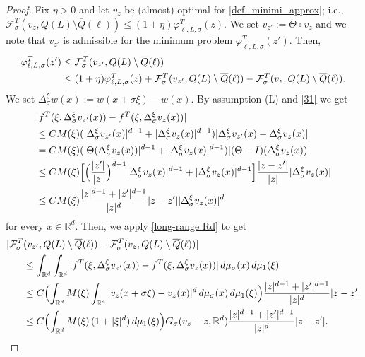 \documentclass{article}
\theoremstyle{plain}
\theoremstyle{definition}
\def\rr{{\mathbb R}}
\def\ms{\mu_\sigma}
\newcommand{\f}{\varphi}
\newcommand{\s}{\sigma}
\numberwithin{equation}{section}
\begin{document}
\begin{proof}
        Fix $\eta>0$ and let $v_{z}$ be (almost) optimal for \eqref{def_minimi_approx}; i.e., $\mathcal{F}^T_{\s}(v_{z},Q(L)\setminus \overline{Q}(\ell)) \leq(1+\eta)\f^T_{\ell,L,\s}(z)$.
 We set $v_{z'}:=\Theta \circ v_z$ and we note that $v_{z'}$ is admissible for the minimum problem $\f^T_{\ell,L,\s}(z')$. 
 Then,
 \begin{align}
\notag \f^T_{\ell,L,\s}(z')&\leq  \mathcal{F}^T_{\s}(v_{z'},Q(L)\setminus \overline{Q}(\ell))\\ \label{stima_funzione_ottimizzante}
     & \leq (1+\eta)\f^T_{\ell,L,\s}(z)+\mathcal{F}^T_{\s}(v_{z'},Q(L)\setminus \overline{Q}(\ell))-\mathcal{F}^T_{\s}(v_{z},Q(L)\setminus \overline{Q}(\ell)).
 \end{align}
 We set $\Delta_\s^\xi w(x):=w(x+\s\xi)-w(x)$. By assumption (L) and \eqref{31} we get
 \begin{align*}
& |f^T(\xi,\Delta_\s^\xi v_{z'}(x))-f^T(\xi,\Delta_\s^\xi v_{z}(x))|    \\      &\leq CM(\xi)(|\Delta_\s^\xi v_{z'}(x)|^{d-1}+|\Delta_\s^\xi v_{z}(x)|^{d-1})|\Delta_\s^\xi v_{z'}(x)-\Delta_\s^\xi v_{z}(x)|\\ \notag
                &=CM(\xi)(|\Theta(\Delta_\s^\xi v_{z}(x))|^{d-1}+|\Delta_\s^\xi v_{z}(x)|^{d-1})|(\Theta-I)(\Delta_\s^\xi v_{z}(x))|\\ \notag
                &\leq CM(\xi)\Bigl[\Bigl(\frac{|z'|}{|z|}\Bigr)^{d-1}|\Delta_\s^\xi v_{z}(x)|^{d-1}+|\Delta^{\xi}_{\s}v_{z}(x)|^{d-1}\Bigr] \frac{|z-z'|}{|z|}|\Delta^{\xi}_{\s}v_{z}(x)|\\
                &\leq CM(\xi)\frac{|z|^{d-1}+|z'|^{d-1}}{|z|^{d}}|z-z'||\Delta^{\xi}_{\s}v_{z}(x)|^{d}
        \end{align*}
        for every $x\in \rr^d$. Then, we apply \eqref{long-range Rd} to get
        \begin{align*}  \notag   
       |\mathcal{F}^T_{\s}&(v_{z'},Q(L)\setminus \overline{Q}(\ell))-\mathcal{F}^T_{\s}(v_{z},Q(L)\setminus \overline{Q}(\ell))|\\ \notag
       &\leq \int_{\rr^d}\int_{\rr^d}|f^T(\xi,\Delta^\xi_\sigma v_{z'}(x))-f^T(\xi,\Delta^\xi_\sigma v_z(x))|\, d\ms(x)\,d\mu_1(\xi)\\ \notag
       &\leq C\Bigl(\int_{\mathbb{R}^{d}}M(\xi)\int_{\rr^d} |v_{z}(x+\s\xi)-v_{z}(x)|^{d}\,d\ms(x)\, d\mu_1(\xi)\Bigr)\frac{|z|^{d-1}+|z'|^{d-1}}{|z|^{d}}|z-z'|\\ 
       &\leq C\Bigl(\int_{\mathbb{R}^{d}}M(\xi)\,(1+|\xi|^d) \,d\mu_1(\xi)\Bigr) G_\sigma(v_z-z,\mathbb{R}^d)\frac{|z|^{d-1}+|z'|^{d-1}}{|z|^{d}}|z-z'|.

\end{align*}
\end{proof}
\end{document}

